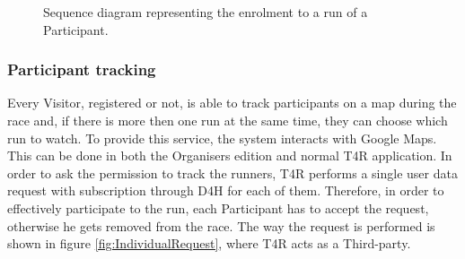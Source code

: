             \begin{figure}[H]
                \centering
                \caption{Sequence diagram representing the enrolment to a run of a Participant.}
                \label{fig:T4R-participant-enrolment}
            \end{figure}
            
        \subsubsection{Participant tracking}
            
            Every Visitor, registered or not, is able to track participants on a map during the race and, if there is more then one run at the same time, they can choose which run to watch. To provide this service, the system interacts with Google Maps. This can be done in both the Organisers edition and normal T4R application.
            In order to ask the permission to track the runners, T4R performs a single user data request with subscription through D4H for each of them. Therefore, in order to effectively participate to the run, each Participant has to accept the request, otherwise he gets removed from the race. The way the request is performed is shown in figure \ref{fig:IndividualRequest}, where T4R acts as a Third-party.
            
